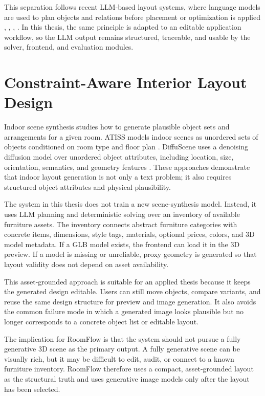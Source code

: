 This separation follows recent LLM-based layout systems, where language models are used to plan objects and relations before placement or optimization is applied \cite{al2023LayoutgptCompositionalVisual}, \cite{al2024IDesignPersonalized}, \cite{al2024HolodeckLanguageGuided}, \cite{Littlefair2025FlairgptRepurposingLlms}. In this thesis, the same principle is adapted to an editable application workflow, so the LLM output remains structured, traceable, and usable by the solver, frontend, and evaluation modules.

\section{Constraint-Aware Interior Layout Design}\label{sec:indoor-scene-synthesis-and-asset-grounded-layouts}

Indoor scene synthesis studies how to generate plausible object sets and arrangements for a given room. ATISS models indoor scenes as unordered sets of objects conditioned on room type and floor plan \cite{Paschalidou2021AtissAutoregressiveTransformers}. DiffuScene uses a denoising diffusion model over unordered object attributes, including location, size, orientation, semantics, and geometry features \cite{Tang2024DiffusceneDenoisingDiffusion}. These approaches demonstrate that indoor layout generation is not only a text problem; it also requires structured object attributes and physical plausibility.

The system in this thesis does not train a new scene-synthesis model. Instead, it uses LLM planning and deterministic solving over an inventory of available furniture assets. The inventory connects abstract furniture categories with concrete items, dimensions, style tags, materials, optional prices, colors, and 3D model metadata. If a GLB model exists, the frontend can load it in the 3D preview. If a model is missing or unreliable, proxy geometry is generated so that layout validity does not depend on asset availability.

This asset-grounded approach is suitable for an applied thesis because it keeps the generated design editable. Users can still move objects, compare variants, and reuse the same design structure for preview and image generation. It also avoids the common failure mode in which a generated image looks plausible but no longer corresponds to a concrete object list or editable layout.

The implication for RoomFlow is that the system should not pursue a fully generative 3D scene as the primary output. A fully generative scene can be visually rich, but it may be difficult to edit, audit, or connect to a known furniture inventory. RoomFlow therefore uses a compact, asset-grounded layout as the structural truth and uses generative image models only after the layout has been selected.

